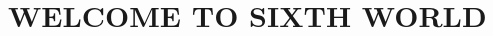 \documentclass[oneside,10pt]{article}
\begin{document}
\generatePageLayouts{}
\switchToLayoutPageA{}


{
  \fancyhf{}
    \fancyhead{}
    \fancyfoot{}
}	%




\begin{multicols}{2}
\tableofcontents
\end{multicols}

\newcommand{\critterspec}[7]{
\setlength{\parskip}{.1em}
\vspace{.5cm}
\begin{minipage}{\linewidth}
{\large\bfseries #1}

{\itshape #2}

#3

#4\vspace{.25em}
\hrule
\vspace{.25em}
#5 \textit{Instinct:} #6
\begin{adjustwidth*}{.5cm}{.5cm}
#7
\end{adjustwidth*}
\end{minipage}
}


\newpage
\pagestyle{fancy}
\setcounter{page}{1}
\renewcommand{\headrulewidth}{0pt} %
\renewcommand{\footrulewidth}{0pt}
\fancyhf{}
\fancyfoot[RO]{\orbitronfont\fontsize{.5cm}{0em}\selectfont\bfseries\thepage}

\section{WELCOME TO SIXTH WORLD}
\end{document}

